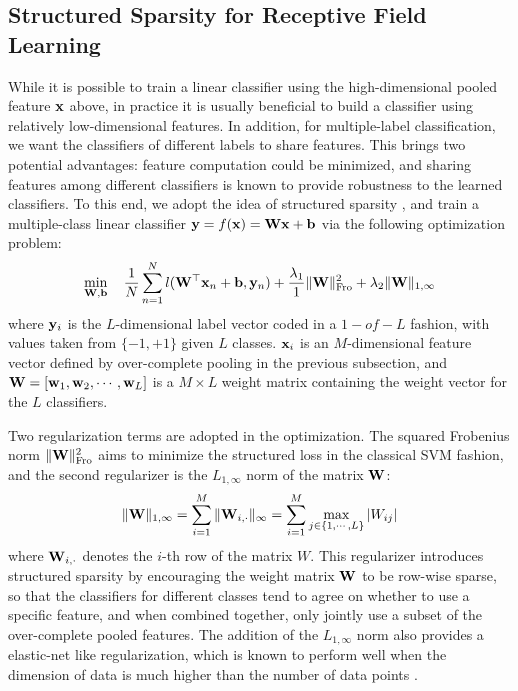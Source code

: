 \subsection{Structured Sparsity for Receptive Field Learning}
While it is possible to train a linear classifier using the high-dimensional pooled feature $\mathbf{x}$ above, in practice it is usually beneficial to build a classifier using relatively low-dimensional features. In addition, for multiple-label classification, we want the classifiers of different labels to share features. This brings two potential advantages: feature computation could be minimized, and sharing features among different classifiers is known to provide robustness to the learned classifiers. To this end, we adopt the idea of structured sparsity \cite{quattoni2008transfer,schmidt2008structure}, and train a multiple-class linear classifier $\mathbf{y} = f(\mathbf{x}) = \mathbf{W}\mathbf{x} + \mathbf{b}$ via the following optimization problem:
\begin{equation}\label{eqn:structuredsparsity}
  \min_{\mathbf{W},\mathbf{b}} \quad \frac{1}{N}\sum_{n=1}^{N}l(\mathbf{W}^\top\mathbf{x}_n+\mathbf{b}, \mathbf{y}_n) + \frac{\lambda_1}{1}\|\mathbf{W}\|_{\mathrm{Fro}}^{2} + \lambda_2\|\mathbf{W}\|_{1,\infty}
\end{equation}
where $\mathbf{y}_i$ is the $L$-dimensional label vector coded in a $1-of-L$ fashion, with values taken from $\{-1,+1\}$ given $L$ classes. $\mathbf{x}_i$ is an $M$-dimensional feature vector defined by over-complete pooling in the previous subsection, and $\mathbf{W} = [\mathbf{w}_1,\mathbf{w}_2,\cdots, \mathbf{w}_L]$ is a $M\times L$ weight matrix containing the weight vector for the $L$ classifiers. 

Two regularization terms are adopted in the optimization. The squared Frobenius norm $\|\mathbf{W}\|_{\mathrm{Fro}}^2$ aims to minimize the structured loss in the classical SVM fashion, and the second regularizer is the $L_{1,\infty}$ norm of the matrix $\mathbf{W}$:
\begin{equation}
  \|\mathbf{W}\|_{1,\infty} = \sum_{i=1}^{M} \|\mathbf{W}_{i,\cdot}\|_{\infty} = \sum_{i=1}^{M}\max_{j\in\{1,\cdots,L\}} |W_{ij}|
\end{equation}
where $\mathbf{W}_{i,\cdot}$ denotes the $i$-th row of the matrix $W$. This regularizer introduces structured sparsity by encouraging the weight matrix $\mathbf{W}$ to be row-wise sparse, so that the classifiers for different classes tend to agree on whether to use a specific feature, and when combined together, only jointly use a subset of the over-complete pooled features. The addition of the $L_{1,\infty}$ norm also provides a elastic-net like regularization, which is known to perform well when the dimension of data is much higher than the number of data points \cite{zou2005regularization}.

